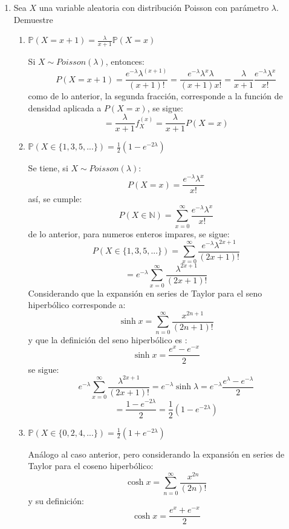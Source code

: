 \documentclass[11pt,a4paper]{report}
\begin{document}
\begin{enumerate}
		\item{
		Sea $X$ una variable aleatoria con distribución Poisson con parámetro
		$\lambda$. Demuestre
			\begin{enumerate}
				\item {
					$\mathbb{P}(X = x + 1) = \frac{\lambda}{x + 1}
					 \mathbb{P}(X = x)$

					Si $X \sim Poisson(\lambda)$, entonces:
						$$ P(X = x + 1) = \frac{e^{-\lambda} \lambda^{(x + 1)}}
										  {(x + 1)!}
						 = \frac{e^{-\lambda} \lambda^x \lambda} {(x + 1) x!}
						 = \frac{\lambda}{x + 1}
						   \frac{e^{-\lambda} \lambda^x}{x!}$$
					como de lo anterior, la segunda fracción, corresponde a
					la función de densidad aplicada a $P(X = x)$, se sigue:
						$$ = \frac{\lambda}{x + 1} f_X^{(x)}
						   = \frac{\lambda}{x + 1} P(X = x)$$
				}

				\item {
					$\mathbb{P}(X \in \{ 1,3,5,...\}) = \frac{1}{2}
					 (1 - e^{-2\lambda})$

					Se tiene, si $X \sim Poisson(\lambda)$:
						$$P(X = x) = \frac{e^{-\lambda} \lambda^x}{x!}$$
					así, se cumple:
						$$P(X \in \mathbb{N}) = \sum_{x=0}^{\infty}
						  \frac{e^{-\lambda} \lambda^x}{x!}$$
					de lo anterior, para numeros enteros impares, se sigue:
						$$P(X \in \{1,3,5,...\}) = \sum_{x=0}^{\infty}
						  \frac{e^{-\lambda} \lambda^{2x + 1}}{(2x + 1)!}$$
						$$ = e^{-\lambda }\sum_{x=0}^{\infty}
						  \frac{\lambda^{2x + 1}}{(2x + 1)!}$$
					Considerando que la expansión en series de Taylor para
					el seno hiperbólico corresponde a:
						$$ \sinh x = \sum_{n=0}^{\infty}
						  \frac{x^{2n + 1}}{(2n + 1)!}  $$
					y que la definición del seno hiperbólico es :
						$$ \sinh x = \frac{e^x - e^{-x}}{2} $$
					se sigue:
						$$ e^{-\lambda }\sum_{x=0}^{\infty}
						   \frac{\lambda^{2x + 1}}{(2x + 1)!}
						  = e^{-\lambda } \sinh \lambda
						  = e^{-\lambda } \frac{e^{\lambda} - e^{-\lambda}}
						    {2} $$
						$$ = \frac{1 - e^{-2\lambda}}{2}
						   = \frac{1}{2}(1 - e^{-2\lambda})$$
				}

				\item {
					$\mathbb{P}(X \in \{ 0,2,4,...\}) = \frac{1}{2}
					 (1 + e^{-2\lambda})$

					Análogo al caso anterior, pero considerando la expansión
					en series de Taylor para el coseno hiperbólico:
						$$ \cosh x = \sum_{n=0}^{\infty}
						  \frac{x^{2n}}{(2n)!}  $$
					y su definición:
						$$ \cosh x = \frac{e^x + e^{-x}}{2} $$

}
\end{enumerate}}
\end{enumerate}
\end{document}
